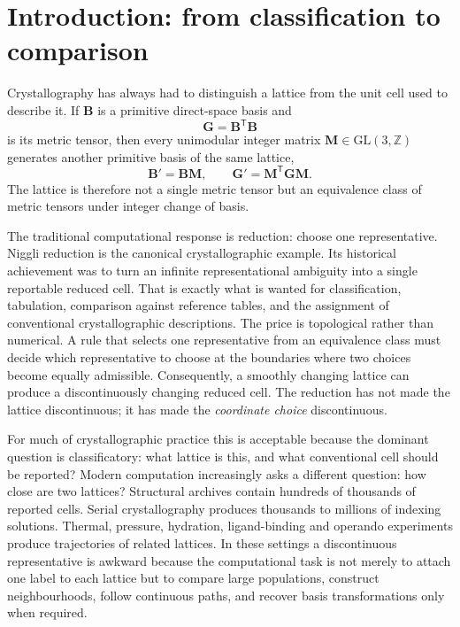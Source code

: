 \documentclass[11pt]{article}
\newcommand{\Gmet}{\mathbf{G}}
\newcommand{\Mop}{\mathbf{M}}
\newcommand{\Bbasis}{\mathbf{B}}
\begin{document}
\section{Introduction: from classification to comparison}

Crystallography has always had to distinguish a lattice from the unit cell used to describe it. If $\Bbasis$ is a primitive direct-space basis and
\begin{equation}
\Gmet = \Bbasis^{\mathsf T}\Bbasis
\end{equation}
is its metric tensor, then every unimodular integer matrix $\Mop\in \mathrm{GL}(3,\mathbb Z)$ generates another primitive basis of the same lattice,
\begin{equation}
\Bbasis' = \Bbasis\Mop, \qquad
\Gmet' = \Mop^{\mathsf T}\Gmet\Mop .
\end{equation}
The lattice is therefore not a single metric tensor but an equivalence class of metric tensors under integer change of basis.

The traditional computational response is reduction: choose one representative. Niggli reduction is the canonical crystallographic example. Its historical achievement was to turn an infinite representational ambiguity into a single reportable reduced cell. That is exactly what is wanted for classification, tabulation, comparison against reference tables, and the assignment of conventional crystallographic descriptions. The price is topological rather than numerical. A rule that selects one representative from an equivalence class must decide which representative to choose at the boundaries where two choices become equally admissible. Consequently, a smoothly changing lattice can produce a discontinuously changing reduced cell. The reduction has not made the lattice discontinuous; it has made the \emph{coordinate choice} discontinuous.

For much of crystallographic practice this is acceptable because the dominant question is classificatory: what lattice is this, and what conventional cell should be reported? Modern computation increasingly asks a different question: how close are two lattices? Structural archives contain hundreds of thousands of reported cells. Serial crystallography produces thousands to millions of indexing solutions. Thermal, pressure, hydration, ligand-binding and operando experiments produce trajectories of related lattices. In these settings a discontinuous representative is awkward because the computational task is not merely to attach one label to each lattice but to compare large populations, construct neighbourhoods, follow continuous paths, and recover basis transformations only when required.
\end{document}
